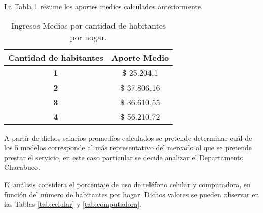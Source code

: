 %
La Tabla \ref{tab:salarios} resume los aportes medios calculados anteriormente.

\begin{table}[H]
  \centering
  \tiny  
    \begin{tabular}{|c|c|}
    \hline
    \textcolor[rgb]{ .122,  .286,  .49}{\textbf{Cantidad de habitantes}} &
      \textcolor[rgb]{ .122,  .286,  .49}{\textbf{Aporte Medio}}
      \bigstrut\\
    \hline
    \textbf{1} &
       \$ 25.204,1 
      \bigstrut\\
    \hline
    \textbf{2} &
      \$ 37.806,16
      \bigstrut\\
    \hline
    \textbf{3} &
      \$ 36.610,55
      \bigstrut\\
    \hline
    \textbf{4} &
      \$ 56.210,72
      \bigstrut\\
    \hline
    \end{tabular}%
    \caption{Ingresos Medios por cantidad de habitantes por hogar.}
  \label{tab:salarios}%
\end{table}%

%
%
A partír de dichos salarios promedios calculados se pretende determinar cuál de los 5 modelos corresponde al más representativo del mercado al que se pretende prestar el servicio, en este caso particular se decide analizar el Departamento Chacabuco.

El análisis considera el porcentaje de uso de teléfono celular y computadora, en función del número de habitantes por hogar. Dichos valores se pueden observar en las Tablas \ref{tab:celular} y \ref{tab:computadora}.



